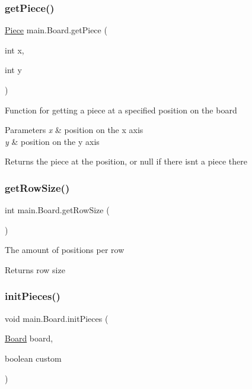 \subsubsection{\texorpdfstring{get\+Piece()}{getPiece()}}
{\footnotesize\ttfamily \hyperlink{classmain_1_1_piece}{Piece} main.\+Board.\+get\+Piece (\begin{DoxyParamCaption}\item[{int}]{x,  }\item[{int}]{y }\end{DoxyParamCaption})}

Function for getting a piece at a specified position on the board 
\begin{DoxyParams}{Parameters}
{\em x} & position on the x axis \\
\hline
{\em y} & position on the y axis \\
\hline
\end{DoxyParams}
\begin{DoxyReturn}{Returns}
the piece at the position, or null if there isn\textquotesingle{}t a piece there 
\end{DoxyReturn}
\mbox{\label{classmain_1_1_board_aabe840fa797394de39d654669f1a13e3}} 
\subsubsection{\texorpdfstring{get\+Row\+Size()}{getRowSize()}}
{\footnotesize\ttfamily int main.\+Board.\+get\+Row\+Size (\begin{DoxyParamCaption}{ }\end{DoxyParamCaption})}

The amount of positions per row \begin{DoxyReturn}{Returns}
row size 
\end{DoxyReturn}
\mbox{\label{classmain_1_1_board_abc9e551a462c7fec722d11e5f3728c23}} 
\subsubsection{\texorpdfstring{init\+Pieces()}{initPieces()}}
{\footnotesize\ttfamily void main.\+Board.\+init\+Pieces (\begin{DoxyParamCaption}\item[{\hyperlink{classmain_1_1_board}{Board}}]{board,  }\item[{boolean}]{custom }\end{DoxyParamCaption})}


